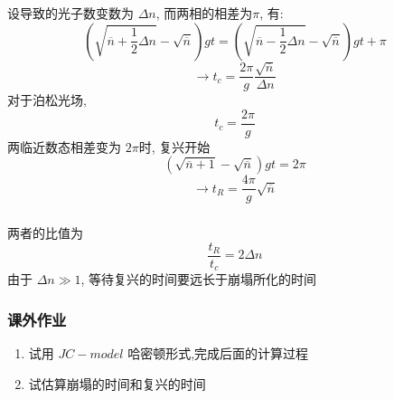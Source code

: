 \begin{frame} 
\frametitle{}
    设导致的光子数变数为 $\Delta n$, 而两相的相差为$\pi$, 有: 
    \[\left(\sqrt{\overline{n}+\frac{1}{2}\Delta n}-\sqrt{\overline{n}}\right) gt = \left(\sqrt{\overline{n}-\frac{1}{2}\Delta n}-\sqrt{\overline{n}}\right) gt + \pi  \]
    \[ \to  t_c = \frac{2\pi}{g} \frac{\sqrt{\overline{n}}}{\Delta n}\]
    对于泊松光场,
    \[ t_c = \frac{2\pi}{g} \]
    两临近数态相差变为 $2\pi$时, 复兴开始
    \[ \left(\sqrt{\overline{n} +1} -\sqrt{\overline{n}}\right) gt = 2\pi \]
    \[ \to t_R= \frac{4\pi}{g}\sqrt{\overline{n}} \]
\end{frame}

\begin{frame} 
\frametitle{}
     两者的比值为
     \[ \frac{t_R}{t_c} = 2 \Delta n \]
     由于 $\Delta n\gg 1$, 等待复兴的时间要远长于崩塌所化的时间
\end{frame}
    \begin{frame} 
        \frametitle{课外作业}
        \begin{enumerate}
            \item 试用 $JC-model$ 哈密顿形式,完成后面的计算过程
            \item 试估算崩塌的时间和复兴的时间
        \end{enumerate}
    \end{frame}

